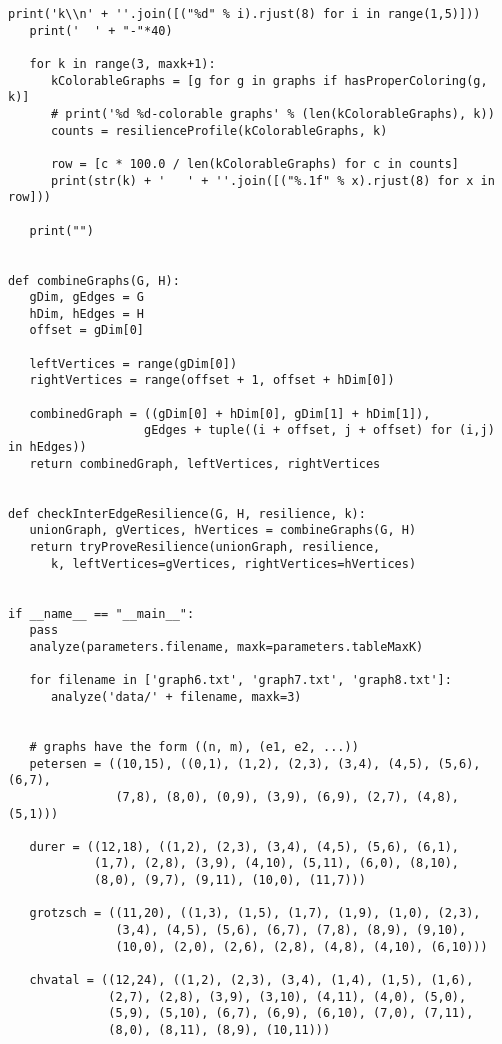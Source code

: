 \begin{lstlisting}[caption={The sourcecode for computing resilience by brute
force and heuristically-guided search.},label=listing:resilience]
   print('k\\n' + ''.join([("%d" % i).rjust(8) for i in range(1,5)]))
   print('  ' + "-"*40)

   for k in range(3, maxk+1):
      kColorableGraphs = [g for g in graphs if hasProperColoring(g, k)]
      # print('%d %d-colorable graphs' % (len(kColorableGraphs), k))
      counts = resilienceProfile(kColorableGraphs, k)

      row = [c * 100.0 / len(kColorableGraphs) for c in counts]
      print(str(k) + '   ' + ''.join([("%.1f" % x).rjust(8) for x in row]))

   print("")


def combineGraphs(G, H):
   gDim, gEdges = G
   hDim, hEdges = H
   offset = gDim[0]

   leftVertices = range(gDim[0])
   rightVertices = range(offset + 1, offset + hDim[0])

   combinedGraph = ((gDim[0] + hDim[0], gDim[1] + hDim[1]),
                   gEdges + tuple((i + offset, j + offset) for (i,j) in hEdges))
   return combinedGraph, leftVertices, rightVertices


def checkInterEdgeResilience(G, H, resilience, k):
   unionGraph, gVertices, hVertices = combineGraphs(G, H)
   return tryProveResilience(unionGraph, resilience, 
      k, leftVertices=gVertices, rightVertices=hVertices)


if __name__ == "__main__":
   pass
   analyze(parameters.filename, maxk=parameters.tableMaxK)

   for filename in ['graph6.txt', 'graph7.txt', 'graph8.txt']:
      analyze('data/' + filename, maxk=3)


   # graphs have the form ((n, m), (e1, e2, ...))
   petersen = ((10,15), ((0,1), (1,2), (2,3), (3,4), (4,5), (5,6), (6,7),
               (7,8), (8,0), (0,9), (3,9), (6,9), (2,7), (4,8), (5,1)))

   durer = ((12,18), ((1,2), (2,3), (3,4), (4,5), (5,6), (6,1),
            (1,7), (2,8), (3,9), (4,10), (5,11), (6,0), (8,10),
            (8,0), (9,7), (9,11), (10,0), (11,7)))

   grotzsch = ((11,20), ((1,3), (1,5), (1,7), (1,9), (1,0), (2,3),
               (3,4), (4,5), (5,6), (6,7), (7,8), (8,9), (9,10),
               (10,0), (2,0), (2,6), (2,8), (4,8), (4,10), (6,10)))

   chvatal = ((12,24), ((1,2), (2,3), (3,4), (1,4), (1,5), (1,6),
              (2,7), (2,8), (3,9), (3,10), (4,11), (4,0), (5,0),
              (5,9), (5,10), (6,7), (6,9), (6,10), (7,0), (7,11),
              (8,0), (8,11), (8,9), (10,11)))


\end{lstlisting}
